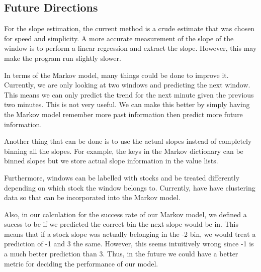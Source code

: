 \documentclass[final]{article}
\begin{document}
\subsection{Future Directions}

For the slope estimation, the current method is a crude estimate that was
chosen for speed and simplicity. A more accurate measurement of the slope of
the window is to perform a linear regression and extract the slope. However,
this may make the program run slightly slower.

In terms of the Markov model, many things could be done to improve it.
Currently, we are only looking at two windows and predicting the next window.
This means we can only predict the trend for the next minute given the previous
two minutes. This is not very useful. We can make this better by simply having
the Markov model remember more past information then predict more future
information.

Another thing that can be done is to use the actual slopes instead of
completely binning all the slopes. For example, the keys in the Markov
dictionary can be binned slopes but we store actual slope information in the
value lists.

Furthermore, windows can be labelled with stocks and be treated differently
depending on which stock the window belongs to. Currently, have have clustering
data so that can be incorporated into the Markov model.

Also, in our calculation for the success rate of our Markov model, we defined a
sucess to be if we predicted the correct bin the next slope would be in. This
means that if a stock slope was actually belonging in the -2 bin, we would
treat a prediction of -1 and 3 the same. However, this seems intuitively wrong
since -1 is a much better prediction than 3. Thus, in the future we could have
a better metric for deciding the performance of our model.
\end{document}
